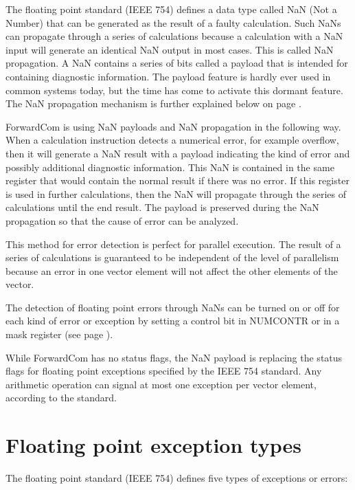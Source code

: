 \documentclass[forwardcom.tex]{subfiles}
\begin{document}
The floating point standard (IEEE 754) defines a data type called NaN (Not a Number) that can be generated as the result of a faulty calculation. Such NaNs can propagate through a series of calculations because a calculation with a NaN input will generate an identical NaN output in most cases. This is called NaN propagation. A NaN contains a series of bits called a payload that is intended for containing diagnostic information. The payload feature is hardly ever used in common systems today, but the time has come to activate this dormant feature. The NaN propagation mechanism is further explained below on page \pageref{nanPropagation}.
\vv

ForwardCom is using NaN payloads and NaN propagation in the following way. When a calculation instruction detects a numerical error, for example overflow, then it will generate a NaN result with a payload indicating the kind of error and possibly additional diagnostic information. This NaN is contained in the same register that would contain the normal result if there was no error. 
If this register is used in further calculations, then the NaN will propagate through the series of calculations until the end result. The payload is preserved during the NaN propagation so that the cause of error can be analyzed.
\vv

This method for error detection is perfect for parallel execution. The result of a series of calculations is guaranteed to be independent of the level of parallelism because an error in one vector element will not affect the other elements of the vector.
\vv

The detection of floating point errors through NaNs can be turned on or off for each kind of error or exception by setting a control bit in NUMCONTR or in a mask register (see page \pageref{table:maskBits}).
\vv

While ForwardCom has no status flags, the NaN payload is replacing the 
status flags for floating point exceptions specified by the IEEE 754 standard. 
Any arithmetic operation can signal at most one exception per vector element, according to the standard.
\vv


\section{Floating point exception types}
\label{FloatingPointExceptionTypes}

The floating point standard (IEEE 754) defines five types of exceptions or errors:
\end{document}
